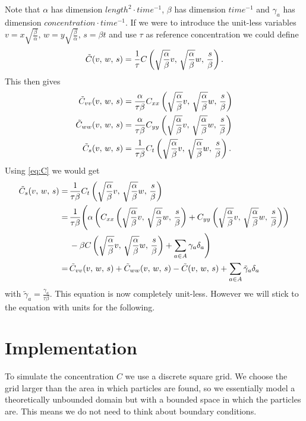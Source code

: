 \documentclass{class}
\begin{document}
Note that $\alpha$ has dimension $length^2\cdot time^{-1}$, $\beta$ has dimension $time^{-1}$ and $\gamma_a$ has dimension $concentration\cdot time^{-1}$.
If we were to introduce the unit-less variables $v=x\sqrt{\frac{\beta}{\alpha}},\,w=y\sqrt{\frac{\beta}{\alpha}},\,s=\beta t$ and use $\tau$ as reference concentration we could define
\begin{align*}
    \tilde{C}(v,\,w,\,s)=\frac{1}{\tau}C\left(\sqrt{\frac{\alpha}{\beta}}v,\,\sqrt{\frac{\alpha}{\beta}}w,\,\frac{s}{\beta}\right).
\end{align*}
This then gives
\begin{align*}
    \tilde{C}_{vv}(v,\,w,\,s)
    &=\frac{\alpha}{\tau\beta}C_{xx}\left(\sqrt{\frac{\alpha}{\beta}}v,\,\sqrt{\frac{\alpha}{\beta}}w,\,\frac{s}{\beta}\right)\\
    \tilde{C}_{ww}(v,\,w,\,s)
    &=\frac{\alpha}{\tau\beta}C_{yy}\left(\sqrt{\frac{\alpha}{\beta}}v,\,\sqrt{\frac{\alpha}{\beta}}w,\,\frac{s}{\beta}\right)\\
    \tilde{C}_{s}(v,\,w,\,s)
    &=\frac{1}{\tau\beta}C_{t}\left(\sqrt{\frac{\alpha}{\beta}}v,\,\sqrt{\frac{\alpha}{\beta}}w,\,\frac{s}{\beta}\right).
\end{align*}
Using \autoref{eq:C} we would get 
\begin{align*}
    \tilde{C}_s(v,\,w,\,s)
    =&\,\frac{1}{\tau\beta}C_{t}\left(\sqrt{\frac{\alpha}{\beta}}v,\,\sqrt{\frac{\alpha}{\beta}}w,\,\frac{s}{\beta}\right)\\
    =&\,\frac{1}{\tau\beta}\Bigg(\alpha\left(C_{xx}\left(\sqrt{\frac{\alpha}{\beta}}v,\,\sqrt{\frac{\alpha}{\beta}}w,\,\frac{s}{\beta}\right)+C_{yy}\left(\sqrt{\frac{\alpha}{\beta}}v,\,\sqrt{\frac{\alpha}{\beta}}w,\,\frac{s}{\beta}\right)\right)\\
    &\,-\beta C\left(\sqrt{\frac{\alpha}{\beta}}v,\,\sqrt{\frac{\alpha}{\beta}}w,\,\frac{s}{\beta}\right)+\sum_{a\in A}\gamma_a\delta_a\Bigg)\\
    =&\,\tilde{C}_{vv}(v,\,w,\,s)+\tilde{C}_{ww}(v,\,w,\,s)-\tilde{C}(v,\,w,\,s)+\sum_{a\in A}\tilde{\gamma}_a\delta_a
\end{align*}
with $\tilde{\gamma}_a=\frac{\gamma_a}{\tau\beta}$.
This equation is now completely unit-less.
However we will stick to the equation with units for the following.

\section{Implementation}

To simulate the concentration $C$ we use a discrete square grid.
We choose the grid larger than the area in which particles are found, so we essentially model a theoretically unbounded domain but with a bounded space in which the particles are.
This means we do not need to think about boundary conditions.
\end{document}
